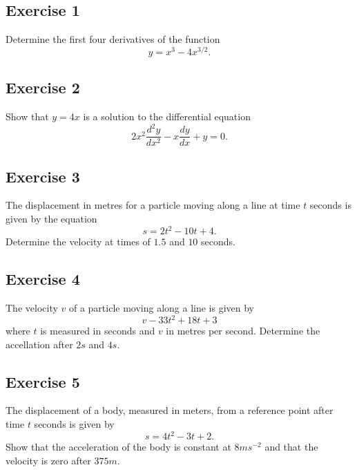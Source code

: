 \documentclass[
  11pt,
  oneside]{book}
\newcommand{\slide}{}
\theoremstyle{definition}
\theoremstyle{definition}
\theoremstyle{definition}
\theoremstyle{definition}
\theoremstyle{remark}
\begin{document}
\subsection*{Exercise 1}\label{exercise-1-2}

Determine the first four derivatives of the function
\[
y=x^3-4x^{3/2}.
\]
\slide

\subsection*{Exercise 2}\label{exercise-2-2}

Show that \(y=4x\) is a solution to the differential equation
\[
2x^2\frac{d^2y}{dx^2}-x\frac{dy}{dx}+y=0.
\]

\slide

\subsection*{Exercise 3}\label{exercise-3-1}

The displacement in metres for a particle moving along a line at time \(t\) seconds is given by the equation
\[
s=2t^2-10t+4.
\]
Determine the velocity at times of \(1.5\) and \(10\) seconds.

\slide

\subsection*{Exercise 4}\label{exercise-4-1}

The velocity \(v\) of a particle moving along a line is given by
\[
v-33t^2+18t+3
\]
where \(t\) is measured in seconds and \(v\) in metres per second. Determine the accellation after \(2s\) and \(4s\).
\slide

\subsection*{Exercise 5}\label{exercise-5}

The displacement of a body, measured in meters, from a reference point after time \(t\) seconds is given by
\[
s=4t^2-3t+2.
\]
Show that the acceleration of the body is constant at \(8ms^{-2}\) and that the velocity is zero after \(375m\).
\slide
\end{document}

